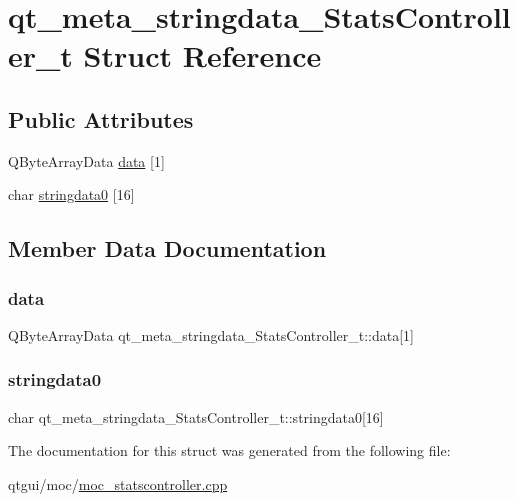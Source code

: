 \hypertarget{structqt__meta__stringdata___stats_controller__t}{}\section{qt\+\_\+meta\+\_\+stringdata\+\_\+\+Stats\+Controller\+\_\+t Struct Reference}
\label{structqt__meta__stringdata___stats_controller__t}
\subsection*{Public Attributes}
\begin{DoxyCompactItemize}
\item 
Q\+Byte\+Array\+Data \mbox{\hyperlink{structqt__meta__stringdata___stats_controller__t_a6509179a9d197d4461450bf16027f1f3}{data}} \mbox{[}1\mbox{]}
\item 
char \mbox{\hyperlink{structqt__meta__stringdata___stats_controller__t_ad5e6513525e07bca8c39c77bb31263c8}{stringdata0}} \mbox{[}16\mbox{]}
\end{DoxyCompactItemize}


\subsection{Member Data Documentation}
\mbox{\label{structqt__meta__stringdata___stats_controller__t_a6509179a9d197d4461450bf16027f1f3}} 
\subsubsection{\texorpdfstring{data}{data}}
{\footnotesize\ttfamily Q\+Byte\+Array\+Data qt\+\_\+meta\+\_\+stringdata\+\_\+\+Stats\+Controller\+\_\+t\+::data\mbox{[}1\mbox{]}}

\mbox{\label{structqt__meta__stringdata___stats_controller__t_ad5e6513525e07bca8c39c77bb31263c8}} 
\subsubsection{\texorpdfstring{stringdata0}{stringdata0}}
{\footnotesize\ttfamily char qt\+\_\+meta\+\_\+stringdata\+\_\+\+Stats\+Controller\+\_\+t\+::stringdata0\mbox{[}16\mbox{]}}



The documentation for this struct was generated from the following file\+:\begin{DoxyCompactItemize}
\item 
qtgui/moc/\mbox{\hyperlink{moc__statscontroller_8cpp}{moc\+\_\+statscontroller.\+cpp}}\end{DoxyCompactItemize}
